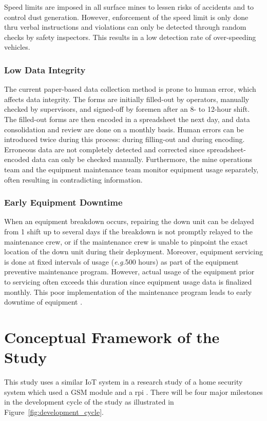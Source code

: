\documentclass[12pt]{report}
\newcommand{\eg}{\emph{e.g.}}
\begin{document}
Speed limits are imposed in all surface mines to lessen risks of accidents and to control dust generation.
However, enforcement of the speed limit is only done thru verbal instructions and violations can only be detected through random checks by safety inspectors.
This results in a low detection rate of over-speeding vehicles.

\subsubsection{Low Data Integrity}

The current paper-based data collection method is prone to human error, which affects data integrity.
The forms are initially filled-out by operators, manually checked by supervisors, and signed-off by foremen after an 8- to 12-hour shift.
The filled-out forms are then encoded in a spreadsheet the next day, and data consolidation and review are done on a monthly basis.
Human errors can be introduced twice during this process: during filling-out and during encoding.
Erroneous data are not completely detected and corrected since spreadsheet-encoded data can only be checked manually. 
Furthermore, the mine operations team and the equipment maintenance team monitor equipment usage separately, often resulting in contradicting information.

\subsubsection{Early Equipment Downtime}

When an equipment breakdown occurs, repairing the down unit can be delayed from 1 shift up to several days if the breakdown is not promptly relayed to the maintenance crew, or if the maintenance crew is unable to pinpoint the exact location of the down unit during their deployment.
Moreover, equipment servicing is done at fixed intervals of usage (\eg 500 hours) as part of the equipment preventive maintenance program.
However, actual usage of the equipment prior to servicing often exceeds this duration since equipment usage data is finalized monthly.
This poor implementation of the maintenance program leads to early downtime of equipment \cite{EquipmentProductivity}.

\section{Conceptual Framework of the Study}

This study uses a similar IoT system in a research study of a home security system which used a GSM module and a \Gls{rpi} \cite{GSMRPi}.
There will be four major milestones in the development cycle of the study as illustrated in Figure~\ref{fig:development_cycle}.
\end{document}
